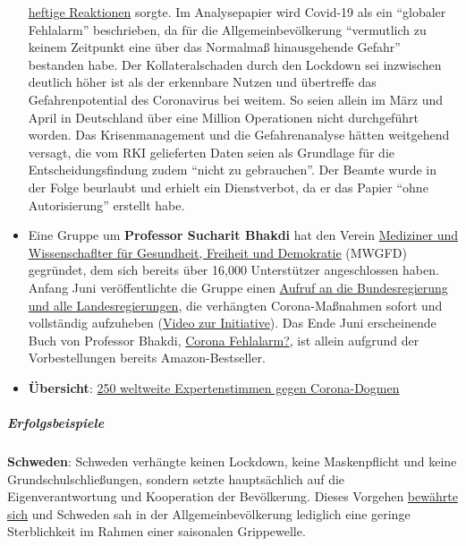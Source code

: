 \begin{itemize}
  \href{https://www.zeit.de/politik/deutschland/2020-05/corona-pandemie-bekaempfung-massnahmen-innenministerium-verschwoerungstheorien-regierungsrat/komplettansicht}{heftige
  Reaktionen} sorgte. Im Analysepapier wird Covid-19 als ein ``globaler
  Fehlalarm'' beschrieben, da für die Allgemeinbevölkerung ``vermutlich
  zu keinem Zeitpunkt eine über das Normalmaß hinausgehende Gefahr''
  bestanden habe. Der Kollateralschaden durch den Lockdown sei
  inzwischen deutlich höher ist als der erkennbare Nutzen und übertreffe
  das Gefahrenpotential des Coronavirus bei weitem. So seien allein im
  März und April in Deutschland über eine Million Operationen nicht
  durchgeführt worden. Das Krisen­management und die Gefahrenanalyse
  hätten weitgehend versagt, die vom RKI gelieferten Daten seien als
  Grundlage für die Entscheidungsfindung zudem ``nicht zu gebrauchen''.
  Der Beamte wurde in der Folge beurlaubt und erhielt ein Dienstverbot,
  da er das Papier ``ohne Autorisierung'' erstellt habe.
\item
  Eine Gruppe um \textbf{Professor Sucharit Bhakdi} hat den Verein
  \href{https://www.mwgfd.de/}{Mediziner und Wissenschaflter für
  Gesundheit, Freiheit und Demokratie} (MWGFD) gegründet, dem sich
  bereits über 16,000 Unterstützer angeschlossen haben. Anfang Juni
  veröffentlichte die Gruppe einen
  \href{https://www.mwgfd.de/category/topaktuell/}{Aufruf an die
  Bundesregierung und alle Landesregierungen}, die verhängten
  Corona-Maßnahmen sofort und vollständig aufzuheben
  (\href{https://www.youtube.com/watch?v=rNev1_UBxvQ}{Video zur
  Initiative}). Das Ende Juni erscheinende Buch von Professor Bhakdi,
  \href{https://www.amazon.de/Corona-Fehlalarm-Daten-Fakten-Hintergr\%C3\%BCnde/dp/3990601911}{Corona
  Fehlalarm?}, ist allein aufgrund der Vorbestellungen bereits
  Amazon-Bestseller.
\item
  \textbf{Übersicht}:
  \href{https://www.rubikon.news/artikel/weltweiter-widerstand}{250
  weltweite Expertenstimmen gegen Corona-Dogmen}
\end{itemize}

\hypertarget{erfolgsbeispiele}{%
\subparagraph{\texorpdfstring{\textbf{Erfolgsbeispiele}}{Erfolgsbeispiele}}\label{erfolgsbeispiele}}

\textbf{Schweden}: Schweden verhängte keinen Lockdown, keine
Maskenpflicht und keine Grundschul­schließungen, sondern setzte
hauptsächlich auf die Eigenverantwortung und Kooperation der
Bevölkerung. Dieses Vorgehen
\href{https://www.nationalreview.com/2020/05/coronavirus-crisis-sweden-refused-lockdown-other-countries-following/}{bewährte
sich} und Schweden sah in der Allgemein­bevölkerung lediglich eine
geringe Sterblichkeit im Rahmen einer saisonalen Grippewelle.

